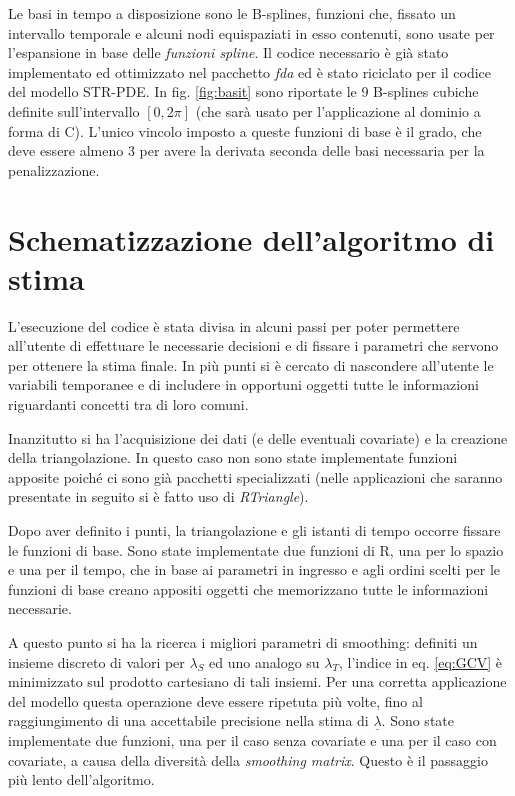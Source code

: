 \documentclass[a4paper,11pt,twoside,openright]{book}							%
\begin{document}
Le basi in tempo a disposizione sono le B-splines, funzioni che, fissato un intervallo temporale e alcuni nodi equispaziati in esso contenuti, sono usate per l'espansione in base delle \textit{funzioni spline}. Il codice necessario è già stato implementato ed ottimizzato nel pacchetto \textit{fda} ed è stato riciclato per il codice del modello STR-PDE. In fig. \ref{fig:basit} sono riportate le 9 B-splines cubiche definite sull'intervallo $[0,2\pi]$ (che sarà usato per l'applicazione al dominio a forma di C). L'unico vincolo imposto a queste funzioni di base è il grado, che deve essere almeno 3 per avere la derivata seconda delle basi necessaria per la penalizzazione.

\section{Schematizzazione dell'algoritmo di stima}
L'esecuzione del codice è stata divisa in alcuni passi per poter permettere all'utente di effettuare le necessarie decisioni e di fissare i parametri che servono per ottenere la stima finale. In più punti si è cercato di nascondere all'utente le variabili temporanee e di includere in opportuni oggetti tutte le informazioni riguardanti concetti tra di loro comuni. 

Inanzitutto si ha l'acquisizione dei dati (e delle eventuali covariate) e la creazione della triangolazione. In questo caso non sono state implementate funzioni apposite poiché ci sono già pacchetti specializzati (nelle applicazioni che saranno presentate in seguito si è fatto uso di \textit{RTriangle}).

Dopo aver definito i punti, la triangolazione e gli istanti di tempo occorre fissare le funzioni di base. Sono state implementate due funzioni di R, una per lo spazio e una per il tempo, che in base ai parametri in ingresso e agli ordini scelti per le funzioni di base creano appositi oggetti che memorizzano tutte le informazioni necessarie.  

A questo punto si ha la ricerca i migliori parametri di smoothing: definiti un insieme discreto di valori per $\lambda_S$ ed uno analogo su $\lambda_T$, l'indice in eq. \ref{eq:GCV} è minimizzato sul prodotto cartesiano di tali insiemi. Per una corretta applicazione del modello questa operazione deve essere ripetuta più volte, fino al raggiungimento di una accettabile precisione nella stima di $\underline{\lambda}$. Sono state implementate due funzioni, una per il caso senza covariate e una per il caso con covariate, a causa della diversità della \textit{smoothing matrix}. Questo è il passaggio più lento dell'algoritmo.
\end{document}
